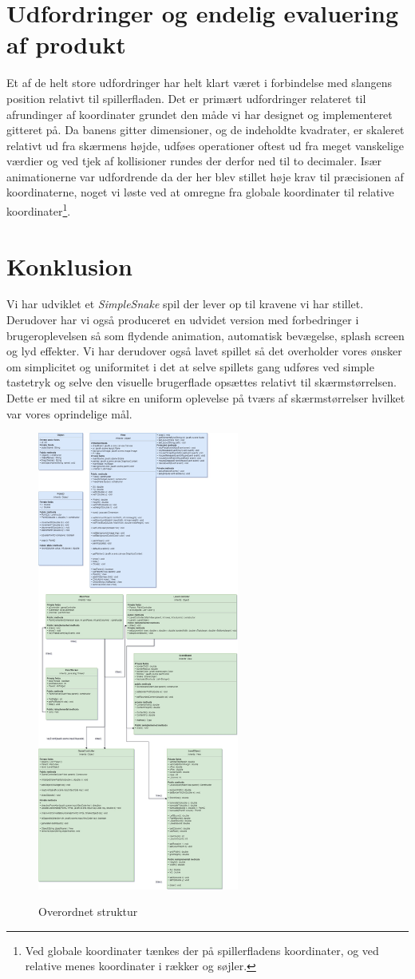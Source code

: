 \documentclass[]{article}
\begin{document}
\section{Udfordringer og endelig evaluering af produkt}

Et af de helt store udfordringer har helt klart været i forbindelse med slangens position relativt til spillerfladen. Det er primært udfordringer relateret til afrundinger af koordinater grundet den måde vi har designet og implementeret gitteret på. Da banens gitter dimensioner, og de indeholdte kvadrater, er skaleret relativt ud fra skærmens højde, udføes operationer oftest ud fra meget vanskelige værdier og ved tjek af kollisioner rundes der derfor ned til to decimaler. Især animationerne var udfordrende da der her blev stillet høje krav til præcisionen af koordinaterne, noget vi løste ved at omregne fra globale koordinater til relative koordinater\footnote{Ved globale koordinater tænkes der på spillerfladens koordinater, og ved relative menes koordinater i rækker og søjler.}.


\section{Konklusion}

Vi har udviklet et \textit{SimpleSnake} spil der lever op til kravene vi har stillet. Derudover har vi også produceret en udvidet version med forbedringer i brugeroplevelsen så som flydende animation, automatisk bevægelse, splash screen og lyd effekter. 
Vi har derudover også lavet spillet så det overholder vores ønsker om simplicitet og uniformitet i det at selve spillets gang udføres ved simple tastetryk og selve den visuelle brugerflade opsættes relativt til skærmstørrelsen. Dette er med til at sikre en uniform oplevelse på tværs af skærmstørrelser hvilket var vores oprindelige mål. 


\pagebreak
\begin{figure}[h!]
	\centering
	\includegraphics[width=250px]{Structural_diagram.jpg}
	\label{fig:structure}
	\caption{Overordnet struktur}
\end{figure}
\end{document}
